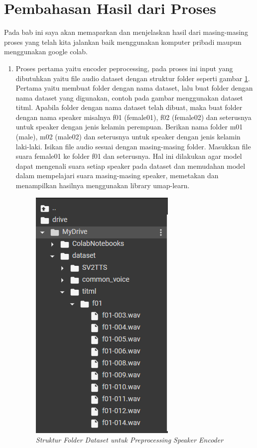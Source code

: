 \section{Pembahasan Hasil dari Proses}
Pada bab ini saya akan memaparkan dan menjelaskan hasil dari masing-masing proses yang telah kita jalankan baik menggunakan komputer pribadi maupun menggunakan google colab.
\begin{enumerate}
\item Proses pertama yaitu encoder peprocessing, pada proses ini input yang dibutuhkan yaitu file audio dataset dengan struktur folder seperti gambar \ref{hasil2}. Pertama yaitu membuat folder dengan nama dataset, lalu buat folder dengan nama dataset yang digunakan, contoh pada gambar menggunakan dataset titml. Apabila folder dengan nama dataset telah dibuat, maka buat folder dengan nama speaker misalnya f01 (female01), f02 (female02) dan seterusnya untuk speaker dengan jenis kelamin perempuan. Berikan nama folder m01 (male), m02 (male02) dan seterusnya untuk speaker dengan jenis kelamin laki-laki. Isikan file audio sesuai dengan masing-masing folder. Masukkan file suara female01 ke folder f01 dan seterusnya. Hal ini dilakukan agar model dapat mengenali suara setiap speaker pada dataset dan memudahan model dalam mempelajari suara masing-masing speaker, memetakan dan menampilkan hasilnya menggunakan library umap-learn.

\begin{figure}[H]
    \centering
    \includegraphics[scale=0.5]{figures/hasil2}
    \caption{\textit{Struktur Folder Dataset untuk Preprocessing Speaker Encoder}}
    \label{hasil2}
\end{figure}


\end{enumerate}
